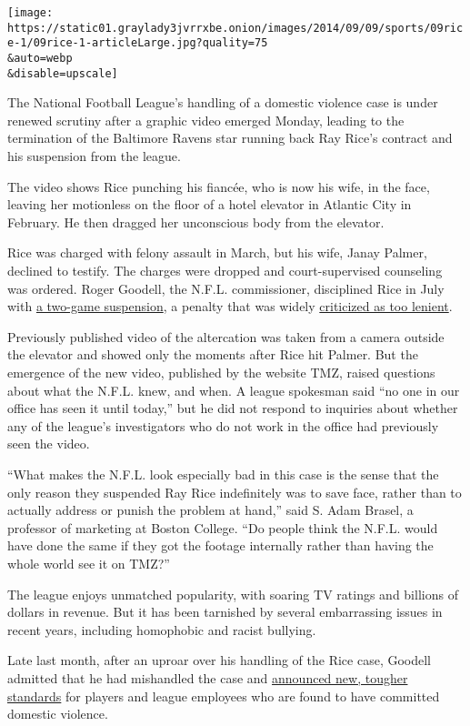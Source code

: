 \texttt{[image: https://static01.graylady3jvrrxbe.onion/images/2014/09/09/sports/09rice-1/09rice-1-articleLarge.jpg?quality=75\\\&auto=webp\\\&disable=upscale]}

The National Football League's handling of a domestic violence case is
under renewed scrutiny after a graphic video emerged Monday, leading to
the termination of the Baltimore Ravens star running back Ray Rice's
contract and his suspension from the league.

The video shows Rice punching his fiancée, who is now his wife, in the
face, leaving her motionless on the floor of a hotel elevator in
Atlantic City in February. He then dragged her unconscious body from the
elevator.

Rice was charged with felony assault in March, but his wife, Janay
Palmer, declined to testify. The charges were dropped and
court-supervised counseling was ordered. Roger Goodell, the N.F.L.
commissioner, disciplined Rice in July with
\href{http://www.nytimes3xbfgragh.onion/2014/07/25/sports/football/ray-rice-draws-2-game-suspension-from-nfl.html}{a
two-game suspension}, a penalty that was widely
\href{http://www.nytimes3xbfgragh.onion/2014/07/25/sports/football/a-penalty-for-abuse-is-less-than-for-steroids-.html}{criticized
as too lenient}.

Previously published video of the altercation was taken from a camera
outside the elevator and showed only the moments after Rice hit Palmer.
But the emergence of the new video, published by the website TMZ, raised
questions about what the N.F.L. knew, and when. A league spokesman said
``no one in our office has seen it until today,'' but he did not respond
to inquiries about whether any of the league's investigators who do not
work in the office had previously seen the video.

``What makes the N.F.L. look especially bad in this case is the sense
that the only reason they suspended Ray Rice indefinitely was to save
face, rather than to actually address or punish the problem at hand,''
said S. Adam Brasel, a professor of marketing at Boston College. ``Do
people think the N.F.L. would have done the same if they got the footage
internally rather than having the whole world see it on TMZ?''

The league enjoys unmatched popularity, with soaring TV ratings and
billions of dollars in revenue. But it has been tarnished by several
embarrassing issues in recent years, including homophobic and racist
bullying.

Late last month, after an uproar over his handling of the Rice case,
Goodell admitted that he had mishandled the case and
\href{http://www.nytimes3xbfgragh.onion/2014/08/29/sports/football/roger-goodell-admits-he-was-wrong-and-alters-nfl-policy-on-domestic-violence.html}{announced
new, tougher standards} for players and league employees who are found
to have committed domestic violence.


